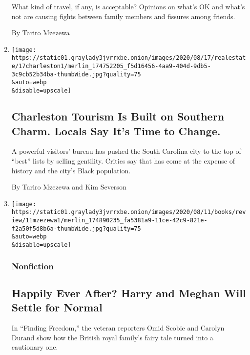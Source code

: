 \begin{enumerate}
  What kind of travel, if any, is acceptable? Opinions on what's OK and
  what's not are causing fights between family members and fissures
  among friends.

  By Tariro Mzezewa
\item
  \href{/2020/08/12/travel/charleston-tourism-black-lives-matter.html}{}

  \texttt{[image: https://static01.graylady3jvrrxbe.onion/images/2020/08/17/realestate/17charleston1/merlin\_174752205\_f5d16456-4aa9-404d-9db5-3c9cb52b34ba-thumbWide.jpg?quality=75\\\&auto=webp\\\&disable=upscale]}

  \hypertarget{charleston-tourism-is-built-on-southern-charm-locals-say-its-time-to-change}{%
  \subsection{Charleston Tourism Is Built on Southern Charm. Locals Say
  It's Time to
  Change.}\label{charleston-tourism-is-built-on-southern-charm-locals-say-its-time-to-change}}

  A powerful visitors' bureau has pushed the South Carolina city to the
  top of ``best'' lists by selling gentility. Critics say that has come
  at the expense of history and the city's Black population.

  By Tariro Mzezewa and Kim Severson
\item
  \href{/2020/08/11/books/review/finding-freedom-omid-scobie-carolyn-durand.html}{}

  \texttt{[image: https://static01.graylady3jvrrxbe.onion/images/2020/08/11/books/review/11mzezewa1/merlin\_174890235\_fa5381a9-11ce-42c9-821e-f2a50f5d8b6a-thumbWide.jpg?quality=75\\\&auto=webp\\\&disable=upscale]}

  \hypertarget{nonfiction}{%
  \subsubsection{Nonfiction}\label{nonfiction}}

  \hypertarget{happily-ever-after-harry-and-meghan-will-settle-for-normal}{%
  \subsection{Happily Ever After? Harry and Meghan Will Settle for
  Normal}\label{happily-ever-after-harry-and-meghan-will-settle-for-normal}}

  In ``Finding Freedom,'' the veteran reporters Omid Scobie and Carolyn
  Durand show how the British royal family's fairy tale turned into a
  cautionary one.


\end{enumerate}
